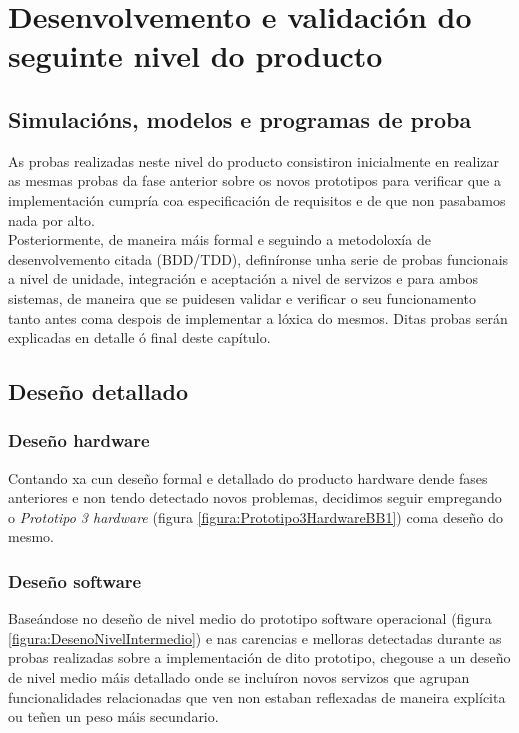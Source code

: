 \section{Desenvolvemento e validación do seguinte nivel do producto}

 \subsection{Simulacións, modelos e programas de proba}
 
 As probas realizadas neste nivel do producto consistiron inicialmente en
 realizar as mesmas probas da fase anterior sobre os novos prototipos para
 verificar que a implementación cumpría coa especificación de requisitos e de
 que non pasabamos nada por alto. \\
 
 Posteriormente, de maneira máis formal e seguindo a metodoloxía de
 desenvolvemento citada (BDD/TDD), definíronse unha serie de probas funcionais
 a nivel de unidade, integración e aceptación a nivel de servizos e para ambos
 sistemas, de maneira que se puidesen validar e verificar o seu funcionamento
 tanto antes coma despois de implementar a lóxica do mesmos. Ditas probas serán
 explicadas en detalle ó final deste capítulo. \\

 \subsection{Deseño detallado}

  \subsubsection{Deseño hardware}
  
  Contando xa cun deseño formal e detallado do producto hardware dende fases
  anteriores e non tendo detectado novos problemas, decidimos seguir empregando
  o \textit{Prototipo 3 hardware} (figura \ref{figura:Prototipo3HardwareBB1})
  coma deseño do mesmo.

  \subsubsection{Deseño software}
  
  Baseándose no deseño de nivel medio do prototipo software operacional
  (figura \ref{figura:DesenoNivelIntermedio}) e nas carencias e melloras
  detectadas durante as probas realizadas sobre a implementación de dito
  prototipo, chegouse a un deseño de nivel medio máis detallado onde se
  incluíron novos servizos que agrupan funcionalidades relacionadas que ven non
  estaban reflexadas de maneira explícita ou teñen un peso máis secundario. \\
  
